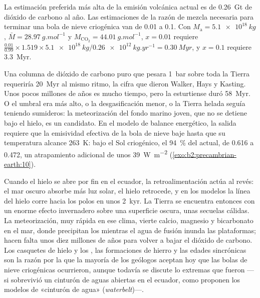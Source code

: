 \begin{example}\label{ex:b2:precambrian-earth:escape}
La estimación preferida más alta de la emisión volcánica actual es de \qty{0.26}{Gt} de dióxido
de carbono al año. Las estimaciones de la
razón de mezcla necesaria para terminar una bola de nieve criogénica van de 0.01 a 0.1. Con $M_{\text{a}} =
\qty{5.1e18}{kg}$, $\bar M = \qty{28.97}{g.mol^{-1}}$ y $M_{\mathrm{CO_2}} =
\qty{44.01}{g.mol^{-1}}$, $x = 0.01$ requiere $\frac{0.01}{0.99}\times1.519\times\qty{5.1e18}{kg}
/ \qty{0.26e12}{kg.yr^{-1}} = \qty{0.30}{Myr}$, y $x = 0.1$ requiere \qty{3.3}{Myr}.
\end{example}

Una columna de dióxido de carbono puro que pesara \qty{1}{bar} sobre toda la Tierra requeriría
\qty{20}{Myr} al mismo ritmo, la cifra que dieron Walker, Hays y Kasting. Unos pocos millones de años
es mucho tiempo, pero la esturtiense duró \qty{58}{Myr}. O el umbral era más alto, o la
desgasificación menor, o la Tierra helada seguía teniendo sumideros: la meteorización del fondo marino joven,
que no se detiene bajo el hielo, es un candidato. En el modelo de balance energético, la salida requiere
que la emisividad efectiva de la bola de nieve baje hasta que su temperatura alcance \qty{263}{K}: bajo
el Sol criogénico, el \qty{94}{\percent} del actual, de 0.616 a 0.472, un atrapamiento adicional de
unos \qty{39}{W.m^{-2}} (\cref{exo:b2:precambrian-earth:10}).

Cuando el hielo se abre por fin en el ecuador, la retroalimentación actúa al revés: el mar oscuro absorbe más
luz solar, el hielo retrocede, y en los modelos la línea del hielo corre hacia los polos en unos
\qty{2}{kyr}. La Tierra se encuentra entonces con un enorme efecto invernadero sobre una superficie oscura, unas
secuelas cálidas. La meteorización, muy rápida en ese clima, vierte calcio, magnesio y bicarbonato en
el mar, donde precipitan los  mientras el agua de fusión inunda las plataformas; hacen falta
unos diez millones de años para volver a bajar el dióxido de carbono. Los casquetes de hielo y los , las formaciones de hierro y las edades sincrónicas son la razón por la que la mayoría de los geólogos aceptan hoy
que las bolas de nieve criogénicas ocurrieron, aunque todavía se discute lo extremas que fueron ---si sobrevivió un cinturón de aguas
abiertas en el ecuador, como proponen los modelos de «cinturón de agua» (\textit{waterbelt})---.

